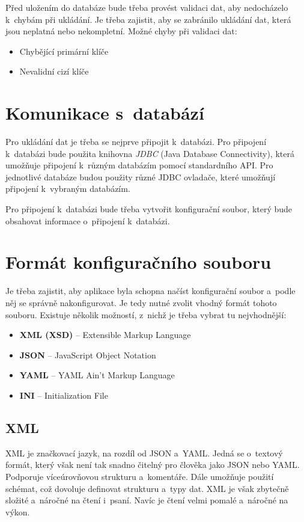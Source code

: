 Před uložením do databáze bude třeba provést validaci dat, aby nedocházelo k~chybám při
ukládání. Je třeba zajistit, aby se zabránilo ukládání dat, která jsou neplatná nebo nekompletní.
Možné chyby při validaci dat:
\begin{itemize}
    \item Chybějící primární klíče
    \item Nevalidní cizí klíče
\end{itemize}

\section{Komunikace s~databází}
\label{sec:komunikaceDB}
Pro ukládání dat je třeba se nejprve připojit k~databázi.
Pro připojení k~databázi bude použita knihovna \textit{JDBC} (Java Database Connectivity), která
umožňuje připojení k~různým databázím pomocí standardního API.
Pro jednotlivé databáze budou použity různé JDBC ovladače, které umožňují připojení k~vybraným databázím.

Pro připojení k~databázi bude třeba vytvořit konfigurační soubor, který bude obsahovat
informace o~připojení k~databázi.

\section{Formát konfiguračního souboru}
Je třeba zajistit, aby aplikace byla schopna načíst konfigurační soubor a~podle něj se správně nakonfigurovat.
Je tedy nutné zvolit vhodný formát tohoto souboru.
Existuje několik možností, z~nichž je třeba vybrat tu nejvhodnější:

\begin{itemize}
    \item \textbf{XML (XSD)} -- Extensible Markup Language
    \item \textbf{JSON} -- JavaScript Object Notation
    \item \textbf{YAML} -- YAML Ain't Markup Language
    \item \textbf{INI} -- Initialization File
\end{itemize}

\newpage

\subsection{XML}
\cite{cisco_xml_json_yaml}
XML je značkovací jazyk, na rozdíl od JSON a~YAML.
Jedná se o~textový formát, který však není tak snadno čitelný pro člověka jako JSON nebo YAML.
Podporuje víceúrovňovou strukturu a~komentáře.
Dále umožňuje použití schémat, což dovoluje definovat strukturu a~typy dat.
XML je však zbytečně složité a~náročné na čtení i~psaní.
Navíc je čtení velmi pomalé a~náročné na výkon.


